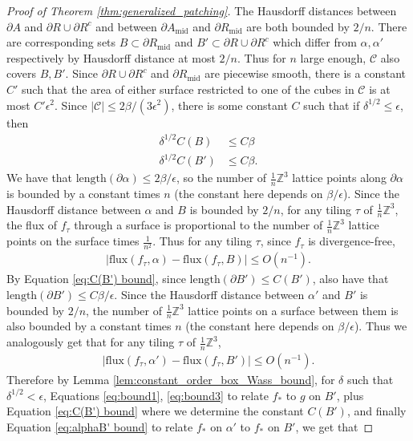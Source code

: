 \documentclass[10pt,a4paper]{amsart}
\newcommand{\m}[1]{\mathbb{#1}}
\newcommand{\mc}[1]{\mathcal{#1}}
\begin{document}
\begin{proof}[Proof of Theorem \ref{thm:generalized_patching}]
The Hausdorff distances between $\partial A$ and $\partial R\cup \partial R^c$ and between $\partial A_{\text{mid}}$ and $\partial R_{\text{mid}}$ are both bounded by $2/n$. There are corresponding sets $B\subset \partial R_{\text{mid}}$ and $B'\subset \partial R\cup \partial R^c$ which differ from $\alpha, \alpha'$ respectively by Hausdorff distance at most $2/n$. Thus for $n$ large enough, $\mc C$ also covers $B,B'$. Since $\partial R\cup \partial R^c$ and $\partial R_{\text{mid}}$ are piecewise smooth, there is a constant $C'$ such that the area of either surface restricted to one of the cubes in $\mc C$ is at most $C' \epsilon^2$. Since $|\mc C| \leq 2\beta/(3\epsilon^2)$, there is some constant $C$ such that if $\delta^{1/2}\leq\epsilon$, then
\begin{align}
    \label{eq:C(B) bound}\delta^{1/2} C(B) &\leq C \beta\\
    \label{eq:C(B') bound}\delta^{1/2}C(B') &\leq C \beta.
\end{align}
We have that $\text{length}(\partial \alpha)\leq 2\beta/\epsilon$, so the number of $\frac{1}{n} \m Z^3$ lattice points along $\partial \alpha$ is bounded by a constant times $n$ (the constant here depends on $\beta/\epsilon$). Since the Hausdorff distance between $\alpha$ and $B$ is bounded by $2/n$, for any tiling $\tau$ of $\frac{1}{n} \m Z^3$, the flux of $f_\tau$ through a surface is proportional to the number of $\frac{1}{n}\m Z^3$ lattice points on the surface times $\frac{1}{n^2}$. Thus for any tiling $\tau$, since $f_\tau$ is divergence-free,
\begin{align}\label{eq:alphaB bound}
    |\text{flux}(f_\tau,\alpha) - \text{flux}(f_\tau,B)| \leq O(n^{-1}).
\end{align}
By Equation \eqref{eq:C(B') bound}, since $\text{length}(\partial B')\leq C(B')$, also have that $\text{length}(\partial B')\leq C \beta/\epsilon$. Since the Hausdorff distance between $\alpha'$ and $B'$ is bounded by $2/n$, the number of $\frac{1}{n}\m Z^3$ lattice points on a surface between them is also bounded by a constant times $n$ (the constant here depends on $\beta/\epsilon$). Thus we analogously get that for any tiling $\tau$ of $\frac{1}{n} \m Z^3$,
\begin{align}\label{eq:alphaB' bound}
    |\text{flux}(f_\tau,\alpha') - \text{flux}(f_\tau,B')| \leq O(n^{-1}).
\end{align}
Therefore by Lemma \ref{lem:constant_order_box_Wass_bound}, for $\delta$ such that $\delta^{1/2}<\epsilon$, Equations \eqref{eq:bound1},   \eqref{eq:bound3} to relate $f_*$ to $g$ on $B'$, plus Equation  \eqref{eq:C(B') bound} where we determine the constant $C(B')$, and finally Equation \eqref{eq:alphaB' bound} to relate $f_*$ on $\alpha'$ to $f_*$ on $B'$, we get that

\end{proof}
\end{document}
